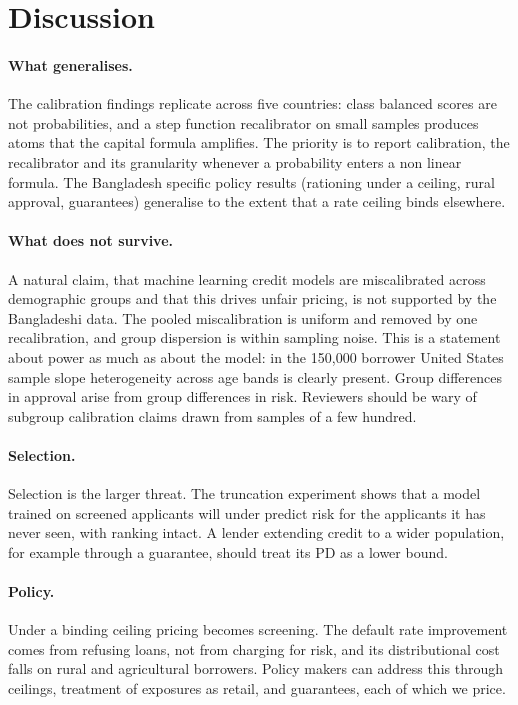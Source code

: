 \documentclass[11pt,a4paper]{article}
\begin{document}
\section{Discussion}\label{sec:disc}
\paragraph{What generalises.} The calibration findings replicate across five countries: class balanced scores are not probabilities, and a step function recalibrator on small samples produces atoms that the capital formula amplifies. The priority is to report calibration, the recalibrator and its granularity whenever a probability enters a non linear formula. The Bangladesh specific policy results (rationing under a ceiling, rural approval, guarantees) generalise to the extent that a rate ceiling binds elsewhere.

\paragraph{What does not survive.} A natural claim, that machine learning credit models are miscalibrated across demographic groups and that this drives unfair pricing, is not supported by the Bangladeshi data. The pooled miscalibration is uniform and removed by one recalibration, and group dispersion is within sampling noise. This is a statement about power as much as about the model: in the 150{,}000 borrower United States sample slope heterogeneity across age bands is clearly present. Group differences in approval arise from group differences in risk. Reviewers should be wary of subgroup calibration claims drawn from samples of a few hundred.

\paragraph{Selection.} Selection is the larger threat. The truncation experiment shows that a model trained on screened applicants will under predict risk for the applicants it has never seen, with ranking intact. A lender extending credit to a wider population, for example through a guarantee, should treat its PD as a lower bound.

\paragraph{Policy.} Under a binding ceiling pricing becomes screening. The default rate improvement comes from refusing loans, not from charging for risk, and its distributional cost falls on rural and agricultural borrowers. Policy makers can address this through ceilings, treatment of exposures as retail, and guarantees, each of which we price.
\end{document}
